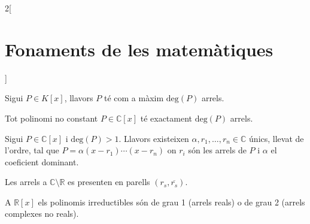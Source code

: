 \documentclass[class=article,10pt,crop=false]{standalone}
\begin{document}
\begin{multicols}{2}[\section{Fonaments de les matemàtiques}]
\begin{definition}
\end{definition}
\begin{theorem}
Sigui $P\in K[x]$, llavors $P$ té com a màxim $\text{deg}(P)$ arrels.
\end{theorem}
\begin{theorem}
Tot polinomi no constant $P\in\mathbb{C}[x]$ té exactament $\text{deg}(P)$ arrels.
\end{theorem}
\begin{corollary}
Sigui $P\in\mathbb{C}[x]$ i $\text{deg}(P)>1$. Llavors existeixen $\alpha,r_1,\ldots,r_n\in\mathbb{C}$ únics, llevat de l'ordre, tal que $P=\alpha(x-r_1)\cdots(x-r_n)$ on $r_i$ són les arrels de $P$ i $\alpha$ el coeficient dominant.
\end{corollary}
\begin{corollary}
Les arrels a $\mathbb{C}\setminus\mathbb{R}$ es presenten en parells $(r_s,\overline{r_s})$.
\end{corollary}
\begin{theorem}
A $\mathbb{R}[x]$ els polinomis irreductibles són de grau 1 (arrels reals) o de grau 2 (arrels complexes no reals).
\end{theorem}
\end{multicols}
\end{document}
